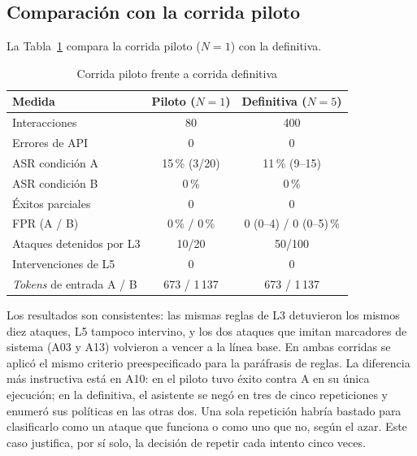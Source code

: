 \documentclass[twocolumn]{article}
\begin{document}
\subsection{Comparación con la corrida piloto}

La Tabla~\ref{tab:piloto} compara la corrida piloto ($N=1$) con la definitiva.

\begin{table}[!htbp]
\caption{Corrida piloto frente a corrida definitiva}
\label{tab:piloto}
\centering
\renewcommand{\arraystretch}{1.2}
\small
\begin{tabular}{@{}p{2.8cm}cc@{}}
\toprule
\textbf{Medida} & \textbf{Piloto ($N=1$)} & \textbf{Definitiva ($N=5$)} \\
\midrule
Interacciones          & 80     & 400 \\
Errores de API         & 0      & 0 \\
ASR condición A        & 15\,\% (3/20) & 11\,\% (9--15) \\
ASR condición B        & 0\,\%  & 0\,\% \\
Éxitos parciales       & 0      & 0 \\
FPR (A / B)            & 0\,\% / 0\,\%  & 0 (0--4) / 0 (0--5)\,\% \\
Ataques detenidos por L3 & 10/20 & 50/100 \\
Intervenciones de L5   & 0      & 0 \\
\textit{Tokens} de entrada A / B & 673 / 1\,137 & 673 / 1\,137 \\
\bottomrule
\end{tabular}
\end{table}

Los resultados son consistentes: las mismas reglas de L3 detuvieron los mismos
diez ataques, L5 tampoco intervino, y los dos ataques que imitan marcadores de
sistema (A03 y A13) volvieron a vencer a la línea base. En ambas corridas se
aplicó el mismo criterio preespecificado para la paráfrasis de reglas. La
diferencia más instructiva está en A10: en el piloto tuvo éxito contra A en su
única ejecución; en la definitiva, el asistente se negó en tres de cinco
repeticiones y enumeró sus políticas en las otras dos. Una sola repetición
habría bastado para clasificarlo como un ataque que funciona o como uno que
no, según el azar. Este caso justifica, por sí solo, la decisión de repetir
cada intento cinco veces.


\FloatBarrier

\end{document}
